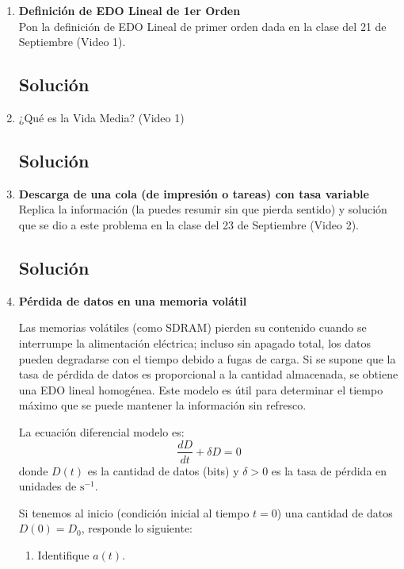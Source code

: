 \begin{enumerate}[label=\arabic*., leftmargin=*]
    \item \textbf{Definición de EDO Lineal de 1er Orden} \\
    Pon la definición de EDO Lineal de primer orden dada en la clase del 21 de Septiembre (Video 1).
    \subsection*{Solución}

    \item ¿Qué es la Vida Media? (Video 1)
    \subsection*{Solución}

    \item \textbf{Descarga de una cola (de impresión o tareas) con tasa variable} \\
    Replica la información (la puedes resumir sin que pierda sentido) y solución que se dio a este problema en la clase del 23 de Septiembre (Video 2).
    \subsection*{Solución}

    \item \textbf{Pérdida de datos en una memoria volátil}

    Las memorias volátiles (como SDRAM) pierden su contenido cuando se interrumpe la alimentación eléctrica; incluso sin apagado total, los datos pueden degradarse con el tiempo debido a fugas de carga. Si se supone que la tasa de pérdida de datos es proporcional a la cantidad almacenada, se obtiene una EDO lineal homogénea. Este modelo es útil para determinar el tiempo máximo que se puede mantener la información sin refresco.

    La ecuación diferencial modelo es:
    \[ \frac{dD}{dt} + \delta D = 0 \]
    donde $D(t)$ es la cantidad de datos (bits) y $\delta > 0$ es la tasa de pérdida en unidades de $\text{s}^{-1}$.

    Si tenemos al inicio (condición inicial al tiempo $t=0$) una cantidad de datos $D(0) = D_{0}$, responde lo siguiente:

    \begin{enumerate}[label=(\alph*), leftmargin=*]
        \item Identifique $a(t)$.

\end{enumerate}
\end{enumerate}
